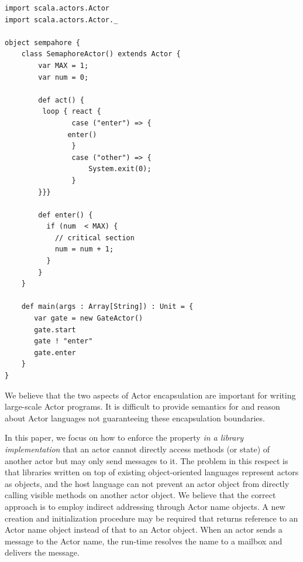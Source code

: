 \makebox[\textwidth]{\hrulefill}
\begin{footnotesize}
\begin{verbatim}
import scala.actors.Actor
import scala.actors.Actor._

object sempahore {
    class SemaphoreActor() extends Actor {
        var MAX = 1;
        var num = 0;

        def act() { 
         loop { react {
                case ("enter") => {
               enter()
                }
                case ("other") => {
                    System.exit(0);
                }
        }}}

        def enter() {
          if (num  < MAX) {
            // critical section
            num = num + 1;
          }
        }
    }

    def main(args : Array[String]) : Unit = {
       var gate = new GateActor()
       gate.start
       gate ! "enter"
       gate.enter
    }
}
\end{verbatim}
\end{footnotesize}
\makebox[\textwidth]{\hrulefill}


We believe that the two aspects of Actor encapsulation are important for writing large-scale Actor programs. It is difficult to provide semantics for and reason about Actor languages not guaranteeing these encapsulation boundaries. 

In this paper, we focus on how to enforce the property \emph{in a library implementation} that an actor cannot directly access methods (or state) of another actor but may only send messages to it. The problem in this respect is that libraries written on top of existing object-oriented languages represent actors as objects, and the host language can not prevent an actor object from directly calling visible methods on another actor object. We believe that the correct approach is to employ indirect addressing through Actor name objects. A new creation and initialization procedure may be required that returns reference to an Actor name object instead of that to an Actor object. When an actor sends a message to the Actor name, the run-time resolves the name to a mailbox and delivers the message.

